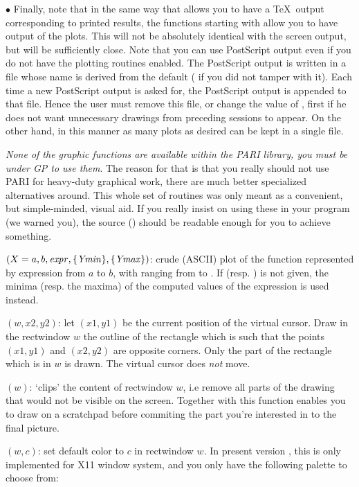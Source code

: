 $\bullet$ Finally, note that in the same way that  allows you
to have a \TeX\ output corresponding to printed results, the functions
starting with  allow you to have  output of the
plots. This will not be absolutely identical with the screen output, but will
be sufficiently close. Note that you can use PostScript output even if you do
not have the plotting routines enabled. The PostScript output is written in a
file whose name is derived from the  default ( if
you did not tamper with it). Each time a new PostScript output is asked for,
the PostScript output is appended to that file. Hence the user must remove
this file, or change the value of , first if he does not want
unnecessary drawings from preceding sessions to appear. On the other hand, in
this manner as many plots as desired can be kept in a single file. \smallskip

\emph{None of the graphic functions are available within the PARI library, you
must be under GP to use them}. The reason for that is that you really should
not use PARI for heavy-duty graphical work, there are much better specialized
alternatives around. This whole set of routines was only meant as a
convenient, but simple-minded, visual aid. If you really insist on using
these in your program (we warned you), the source () should be
readable enough for you to achieve something.

$(X=a,b,\hbox{\it expr\/},\{\hbox{\it Ymin\/}\},\{\hbox{\it Ymax\/}\})$: crude
(ASCII) plot of the function represented by expression  from
$a$ to $b$, with  ranging from  to . If
 (resp. ) is not given, the minima (resp. the
maxima) of the computed values of the expression is used instead.

$(w,x2,y2)$: let $(x1,y1)$ be the current position of the
virtual cursor. Draw in the rectwindow $w$ the outline of the rectangle which
is such that the points $(x1,y1)$ and $(x2,y2)$ are opposite corners. Only
the part of the rectangle which is in $w$ is drawn. The virtual cursor does
\emph{not} move.

$(w)$: `clips' the content of rectwindow $w$, i.e
remove all parts of the drawing that would not be visible on the screen.
Together with  this function enables you to draw on a
scratchpad before commiting the part you're interested in to the final
picture.

$(w,c)$: set default color to $c$ in rectwindow $w$.
In present version \vers, this is only implemented for X11 window system,
and you only have the following palette to choose from:

